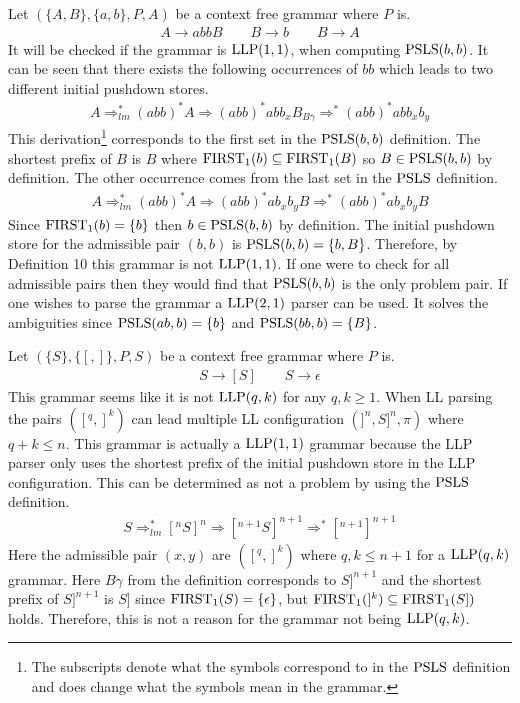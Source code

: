 \begin{example}
    \label{ex:llp21}
    Let $(\{A, B\}, \{a, b\}, P, A)$ be a context free grammar where $P$ is.
    \begin{gather*}
        A \to a b b B \qquad B \to b \qquad B \to A
    \end{gather*}
    It will be checked if the grammar is $\text{LLP}(1, 1)$, when computing $\text{PSLS}(b,b)$. It can be seen that there exists the following occurrences of $bb$ which leads to two different initial pushdown stores.
    \begin{align*}
        A \Rightarrow_{lm}^* (abb)^*A \Rightarrow (abb)^*abb_xB_{B\gamma} \Rightarrow^* (abb)^*abb_xb_y
    \end{align*}
    This derivation\footnote{The subscripts denote what the symbols correspond to in the $\text{PSLS}$ definition and does change what the symbols mean in the grammar.} corresponds to the first set in the $\text{PSLS}(b, b)$ definition. The shortest prefix of $B$ is $B$ where $\text{FIRST}_1(b) \subseteq \text{FIRST}_1(B)$ so $B \in \text{PSLS}(b,b)$ \cite[2]{errata:Vagner2007} by definition. The other occurrence comes from the last set in the $\text{PSLS}$ definition.
    \begin{align*}
        A \Rightarrow_{lm}^* (abb)^*A \Rightarrow (abb)^*ab_xb_yB \Rightarrow^* (abb)^*ab_xb_yB
    \end{align*}
    Since $\text{FIRST}_1(b) = \{b\}$ then $b \in \text{PSLS}(b, b)$ by definition. The initial pushdown store for the admissible pair $(b, b)$ is $\text{PSLS}(b, b) = \{b, B\}$. Therefore, by Definition 10 \cite[13]{Vagner2007} this grammar is not $\text{LLP}(1, 1)$. If one were to check for all admissible pairs then they would find that $\text{PSLS}(b,b)$ is the only problem pair. If one wishes to parse the grammar a $\text{LLP}(2, 1)$ parser can be used. It solves the ambiguities since $\text{PSLS}(ab, b) = \{b\}$ and $\text{PSLS}(bb, b) = \{B\}$.
\end{example}

\begin{example}
    Let $(\{S\}, \{[, ]\}, P, S)$ be a context free grammar where $P$ is.
    \begin{gather*}
        S \to [S] \qquad S \to \epsilon
    \end{gather*}
    This grammar seems like it is not $\text{LLP}(q, k)$ for any $q, k \geq 1$. When LL parsing the pairs $([^q, ]^k)$ can lead multiple LL configuration $(]^n, S]^n, \pi)$ where $q + k \leq n$. This grammar is actually a $\text{LLP}(1,1)$ grammar because the LLP parser only uses the shortest prefix of the initial pushdown store in the LLP configuration. This can be determined as not a problem by using the $\text{PSLS}$ definition.
    \begin{align*}
        S \Rightarrow_{lm}^* [^nS]^n \Rightarrow [^{n + 1}S]^{n + 1} \Rightarrow^* [^{n + 1}]^{n + 1}
    \end{align*}
    Here the admissible pair $(x, y)$ are $([^q, ]^k)$ where $q, k \leq n + 1$ for a $\text{LLP}(q, k)$ grammar. Here $B\gamma$ from the definition corresponds to $S]^{n+1}$ and the shortest prefix of $S]^{n+1}$ is $S]$ since $\text{FIRST}_1(S) = \{\epsilon\}$, but $\text{FIRST}_1(]^k) \subseteq \text{FIRST}_1(S])$ holds. Therefore, this is not a reason for the grammar not being $\text{LLP}(q,k)$.
\end{example}

